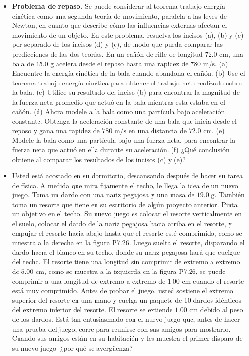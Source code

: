 \documentclass[11pt,a4paper]{article}
\begin{document}
\begin{itemize}
    \item[\textbf{25.}] \textbf{Problema de repaso.} Se puede considerar al teorema trabajo-energía cinética como una segunda teoría de movimiento, paralela a las leyes de Newton, en cuanto que describe cómo las influencias externas afectan el movimiento de un objeto. En este problema, resuelva los incisos (a), (b) y (c) por separado de los incisos (d) y (e), de modo que pueda comparar las predicciones de las dos teorías. En un cañón de rifle de longitud $72.0 \text{ cm}$, una bala de $15.0 \text{ g}$ acelera desde el reposo hasta una rapidez de $780 \text{ m/s}$. (a) Encuentre la energía cinética de la bala cuando abandona el cañón. (b) Use el teorema trabajo-energía cinética para obtener el trabajo neto realizado sobre la bala. (c) Utilice su resultado del inciso (b) para encontrar la magnitud de la fuerza neta promedio que actuó en la bala mientras esta estaba en el cañón. (d) Ahora modele a la bala como una partícula bajo aceleración constante. Obtenga la aceleración constante de una bala que inicia desde el reposo y gana una rapidez de $780 \text{ m/s}$ en una distancia de $72.0 \text{ cm}$. (e) Modele la bala como una partícula bajo una fuerza neta, para encontrar la fuerza neta que actuó en ella durante su aceleración. (f) ¿Qué conclusión obtiene al comparar los resultados de los incisos (c) y (e)?
    \vspace*{8cm}

    \item[\textbf{26.}] Usted está acostado en su dormitorio, descansando después de hacer su tarea de física. A medida que mira fijamente el techo, le llega la idea de un nuevo juego. Toma un dardo con una nariz pegajosa y una masa de $19.0 \text{ g}$. También toma un resorte que tiene en su escritorio de algún proyecto anterior. Pinta un objetivo en el techo. Su nuevo juego es colocar el resorte verticalmente en el suelo, colocar el dardo de la nariz pegajosa hacia arriba en el resorte, y empujar el resorte hacia abajo hasta que el resorte esté comprimido, como se muestra a la derecha en la figura P7.26. Luego suelta el resorte, disparando el dardo hacia el blanco en su techo, donde su nariz pegajosa hará que cuelgue del techo. El resorte tiene una longitud sin comprimir de extremo a extremo de $5.00 \text{ cm}$, como se muestra a la izquierda en la figura P7.26, se puede comprimir a una longitud de extremo a extremo de $1.00 \text{ cm}$ cuando el resorte está muy comprimido. Antes de probar el juego, usted sostiene el extremo superior del resorte en una mano y cuelga un paquete de 10 dardos idénticos del extremo inferior del resorte. El resorte se extiende $1.00 \text{ cm}$ debido al peso de los dardos. Está tan entusiasmado con el nuevo juego que, antes de hacer una prueba del juego, corre para reunirse con sus amigos para mostrarlo. Cuando sus amigos están en su habitación y les muestra el primer disparo de su nuevo juego, ¿por qué se avergüenza?
    \vspace*{7cm}


\end{itemize}
\end{document}
